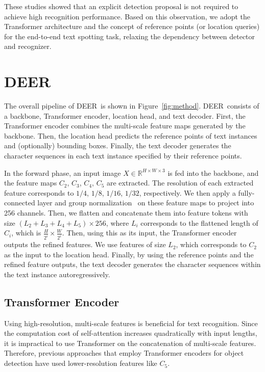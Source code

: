 \documentclass[10pt,twocolumn,letterpaper]{article}
\newcommand{\Figure}[1]{Figure~\ref{fig:#1}}
\newcommand{\methodname}[0]{DEER}
\begin{document}
These studies showed that an explicit detection proposal is not required to achieve high recognition performance.
Based on this observation, we adopt the Transformer architecture and the concept of reference points (or location queries) for the end-to-end text spotting task, relaxing the dependency between detector and recognizer.
 
\section{DEER}








The overall pipeline of \methodname~is shown in \Figure{method}. \methodname~consists of a backbone, Transformer encoder, location head, and text decoder. First, the Transformer encoder combines the multi-scale feature maps generated by the backbone. Then, the location head predicts the reference points of text instances and (optionally) bounding boxes. Finally, the text decoder generates the character sequences in each text instance specified by their reference points. 

In the forward phase, an input image \(X\in\mathbb{R}^{H\times W\times 3}\) is fed into the backbone, and the feature maps \(C_2\), \(C_3\), \(C_4\), \(C_5\) are extracted. The resolution of each extracted feature corresponds to \(1/4\), \(1/8\), \(1/16\), \(1/32\), respectively. We then apply a fully-connected layer and group normalization~\cite{wu2018gn} on these feature maps to project into 256 channels. Then, we flatten and concatenate them into feature tokens with size \((L_2 + L_3 + L_4 + L_5)\times 256\), where \(L_i\) corresponds to the flattened length of \(C_i\), which is \(\frac{H}{2^i}\times\frac{W}{2^i}\). Then, using this as its input, the Transformer encoder outputs the refined features. We use features of size \(L_2\), which corresponds to \(C_2\) as the input to the location head. Finally, by using the reference points and the refined feature outputs, the text decoder generates the character sequences within the text instance autoregressively.






\subsection{Transformer Encoder}

Using high-resolution, multi-scale features is beneficial for text recognition. Since the computation cost of self-attention increases quadratically with input lengths, it is impractical to use Transformer on the concatenation of multi-scale features.  Therefore, previous approaches that employ Transformer encoders for object detection have used lower-resolution features like \(C_5\).
\end{document}

